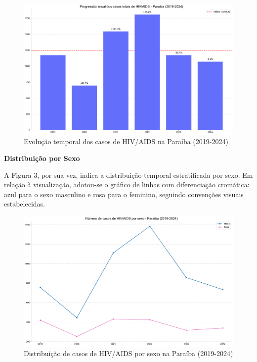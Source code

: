 \documentclass[10pt,a4paper]{article}
\begin{document}
\begin{multicols}{2}
\begin{figure}[H]
    \centering
    \includegraphics[width=\linewidth]{../figs/hiv_aids_pb_2019-2022.pdf}
    \caption{Evolução temporal dos casos de HIV/AIDS na Paraíba (2019-2024)}
    \label{fig:evolucao_temporal}
\end{figure}

\textbf{Distribuição por Sexo}

A Figura 3, por sua vez, indica a distribuição temporal estratificada por sexo. Em relação à visualização, adotou-se o gráfico de linhas com diferenciação cromática: azul para o sexo masculino e rosa para o feminino, seguindo convenções visuais estabelecidas.

\begin{figure}[H]
    \centering
    \includegraphics[width=\linewidth]{../figs/hiv_aids_pb_sex_2019-2022.pdf}
    \caption{Distribuição de casos de HIV/AIDS por sexo na Paraíba (2019-2024)}
    \label{fig:distribuicao_sexo}
\end{figure}


\end{multicols}
\end{document}
